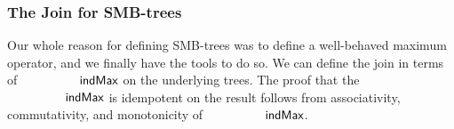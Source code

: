 \begin{code}
\\
\>[6][@{}l@{\AgdaIndent{0}}]%
\>[8]\AgdaSymbol{(}\AgdaSpace{}%
\AgdaSymbol{\AgdaUnderscore{}}\<%
\\
\>[8][@{}l@{\AgdaIndent{0}}]%
\>[10]\AgdaSymbol{(}\AgdaSpace{}%
\AgdaSpace{}%
\AgdaSpace{}%
\AgdaSpace{}%
\AgdaSpace{}%
\AgdaSymbol{(}\AgdaSpace{}%
\AgdaSymbol{))}\AgdaSpace{}%
\AgdaSymbol{))}\<%
\\
%
\>[6]\AgdaSpace{}%
\AgdaSymbol{(}\AgdaSpace{}%
\AgdaSymbol{)}\AgdaSpace{}%
\AgdaSymbol{)}\<%
\end{code}


\subsubsection{The Join for SMB-trees}
Our whole reason for defining SMB-trees was to define a well-behaved maximum operator,
and we finally have the tools to do so.
We can define the join in terms of $\indMax$ on the underlying trees.
The proof that the $\indMax$ is idempotent on the result follows from
associativity, commutativity, and monotonicity of $\indMax$.
\begin{code}%
\>[0]\<%
\\
\>[0][@{}l@{\AgdaIndent{0}}]%
\>[2]\AgdaSpace{}%
\AgdaSpace{}%
\AgdaSpace{}%
\AgdaSpace{}%
\<%
\\
%
\>[2]\AgdaSpace{}%
\AgdaSymbol{:}\AgdaSpace{}%
\AgdaSpace{}%
\AgdaSpace{}%
\AgdaSpace{}%
\AgdaSpace{}%
\<%
\\
%
\>[2]\AgdaSpace{}%
\AgdaSpace{}%
\AgdaSpace{}%
\AgdaSymbol{=}\<%
\\
\>[2][@{}l@{\AgdaIndent{0}}]%
\>[4]\<%
\\
\>[4][@{}l@{\AgdaIndent{0}}]%
\>[6]\AgdaSymbol{(}\AgdaSpace{}%
\AgdaSymbol{(}\AgdaSpace{}%
\AgdaSymbol{)}\AgdaSpace{}%
\AgdaSymbol{(}\AgdaSpace{}%
\AgdaSymbol{))}\<%
\\
%
\>[6]\AgdaSymbol{(}\<%
\\
\>[6][@{}l@{\AgdaIndent{0}}]%
\>[8]\AgdaSpace{}%
\AgdaSpace{}%
\AgdaSymbol{(}\AgdaSpace{}%
\AgdaSymbol{)}\AgdaSpace{}%
\AgdaSymbol{(}\AgdaSpace{}%
\AgdaSymbol{))}\<%
\end{code}

